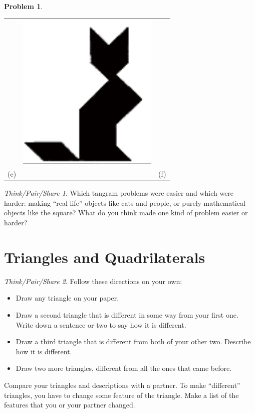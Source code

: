 \documentclass[12pt, reqno]{amsart}
\theoremstyle{remark}
\newtheorem*{thinkpair*}{Think/Pair/Share}
\theoremstyle{definition}
\newtheorem{problem}{Problem}
\numberwithin{equation}{section}  %
\begin{document}
\begin{problem}
\begin{center}
\begin{tabular}{ccc}
\qquad \qquad\qquad& 
\includegraphics[scale=0.7]{tangram6}\\
(e) && (f)\\
\end{tabular}
\end{center}
\end{problem}

\bigskip

\begin{thinkpair*}
Which tangram problems were easier and which were harder: making ``real life'' objects like cats and people, or purely mathematical objects like the square?  What do you think made one kind of problem easier or harder?
\end{thinkpair*}

\newpage

\section{Triangles and Quadrilaterals}


\begin{thinkpair*}
Follow these directions on your own:
\begin{itemize}
\item
Draw any triangle on your paper.\\
\item
Draw a second triangle that is different in some way from your first one. Write down a sentence or two to say how it is different.\\
\item
Draw a third triangle that is different from both of your other two. Describe how it is different.\\
\item
Draw two more triangles, different from all the ones that came before.

\end{itemize}
Compare your triangles and descriptions with a partner.
To make ``different'' triangles, you have to change some feature of the triangle. Make a list of the features  that 
you or your partner changed.

\end{thinkpair*}
\end{document}
